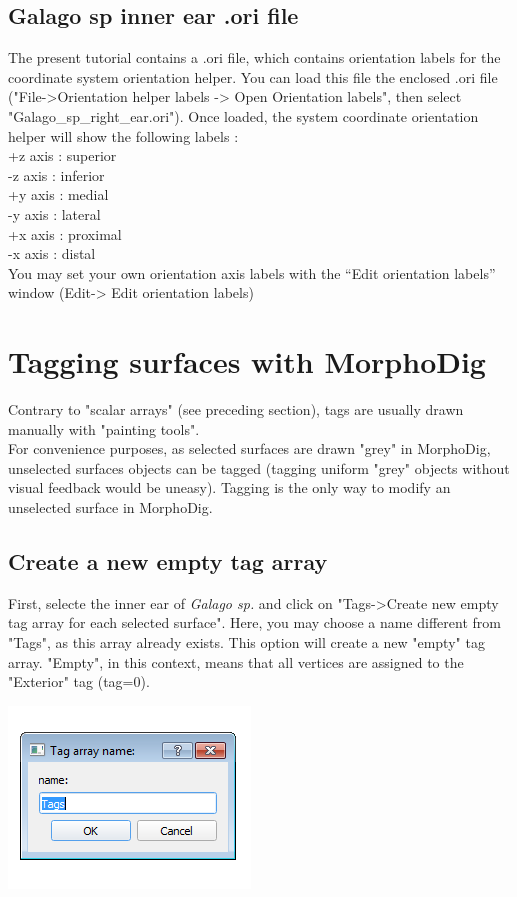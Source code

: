 \documentclass[12pt, a4paper]{book}
\begin{document}
\subsection{Galago sp inner ear .ori file}
The present tutorial contains a .ori file, which contains orientation labels for the coordinate system
orientation helper. You can load this file the enclosed .ori file ("File->Orientation helper labels -> Open Orientation labels", then select
"Galago\_sp\_right\_ear.ori"). Once loaded, the system coordinate orientation helper will show the following
labels :\\
+z axis : superior\\
-z axis : inferior\\
+y axis : medial\\
-y axis : lateral\\
+x axis : proximal\\
-x axis : distal\\
You may set your own orientation axis labels with the “Edit orientation labels” window (Edit-> Edit orientation labels)

\section{Tagging surfaces with MorphoDig}
Contrary to "scalar arrays" (see preceding section), tags are usually drawn manually with "painting tools". \\
For convenience purposes, as selected surfaces are drawn "grey" in MorphoDig, unselected surfaces objects can be tagged (tagging uniform "grey" objects without visual feedback would be uneasy). Tagging is the only way to modify an unselected surface in MorphoDig. \\
\subsection{Create a new empty tag array}\label{empty_tag_array}

\begin{minipage}{0.5\textwidth}
First, selecte the inner ear of \textit{Galago sp.} and click on "Tags->Create new empty tag array for each selected surface". Here, you may choose a name different from "Tags", as this array already exists. This option will create a new "empty" tag array. "Empty", in this context, means that all vertices are assigned to the "Exterior" tag (tag=0).\end{minipage} 
\begin{minipage}{0.5\textwidth}\centering
  \includegraphics[scale=0.5]{../images/12/empty_tag_array.png}
 \end{minipage} 
\end{document}
